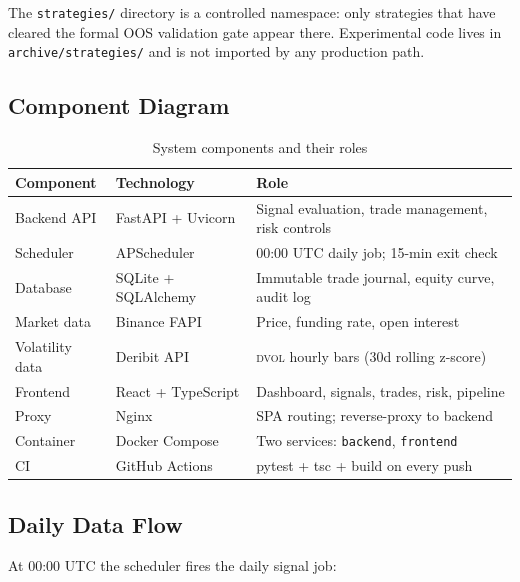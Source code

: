\documentclass[12pt, a4paper]{article}
\theoremstyle{definition}
\newcommand{\DVOL}{\textsc{dvol}}
\begin{document}
The \texttt{strategies/} directory is a controlled namespace: only strategies
that have cleared the formal OOS validation gate appear there. Experimental
code lives in \texttt{archive/strategies/} and is not imported by any
production path.

\subsection{Component Diagram}

\begin{table}[H]
\centering
\caption{System components and their roles}
\begin{tabularx}{\linewidth}{llX}
\toprule
\textbf{Component} & \textbf{Technology} & \textbf{Role} \\
\midrule
Backend API       & FastAPI + Uvicorn       & Signal evaluation, trade management, risk controls \\
Scheduler         & APScheduler             & 00:00 UTC daily job; 15-min exit check \\
Database          & SQLite + SQLAlchemy     & Immutable trade journal, equity curve, audit log \\
Market data       & Binance FAPI            & Price, funding rate, open interest \\
Volatility data   & Deribit API             & \DVOL{} hourly bars (30d rolling z-score) \\
Frontend          & React + TypeScript      & Dashboard, signals, trades, risk, pipeline \\
Proxy             & Nginx                   & SPA routing; reverse-proxy to backend \\
Container         & Docker Compose          & Two services: \texttt{backend}, \texttt{frontend} \\
CI                & GitHub Actions          & pytest + tsc + build on every push \\
\bottomrule
\end{tabularx}
\end{table}

\subsection{Daily Data Flow}

At 00:00 UTC the scheduler fires the daily signal job:
\end{document}
